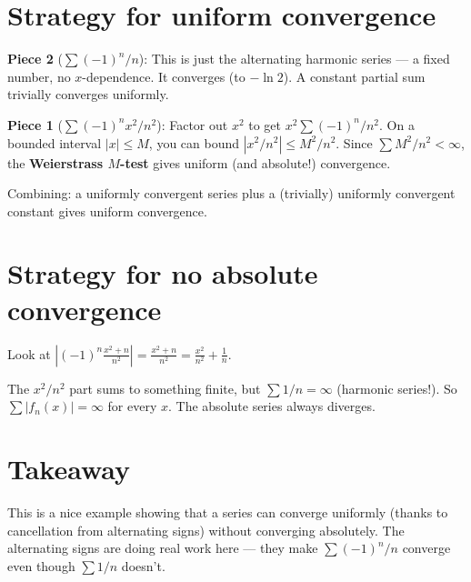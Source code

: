 \documentclass[12pt]{article}
\begin{document}
\section*{Strategy for uniform convergence}

\textbf{Piece 2} ($\sum (-1)^n / n$): This is just the alternating harmonic series --- a fixed number, no $x$-dependence. It converges (to $-\ln 2$). A constant partial sum trivially converges uniformly.

\textbf{Piece 1} ($\sum (-1)^n x^2/n^2$): Factor out $x^2$ to get $x^2 \sum (-1)^n/n^2$. On a bounded interval $|x| \leq M$, you can bound $|x^2/n^2| \leq M^2/n^2$. Since $\sum M^2/n^2 < \infty$, the \textbf{Weierstrass $M$-test} gives uniform (and absolute!) convergence.

Combining: a uniformly convergent series plus a (trivially) uniformly convergent constant gives uniform convergence.

\section*{Strategy for no absolute convergence}

Look at $\left|(-1)^n \frac{x^2+n}{n^2}\right| = \frac{x^2+n}{n^2} = \frac{x^2}{n^2} + \frac{1}{n}$.

The $x^2/n^2$ part sums to something finite, but $\sum 1/n = \infty$ (harmonic series!). So $\sum |f_n(x)| = \infty$ for every $x$. The absolute series always diverges.

\section*{Takeaway}

This is a nice example showing that a series can converge uniformly (thanks to cancellation from alternating signs) without converging absolutely. The alternating signs are doing real work here --- they make $\sum (-1)^n/n$ converge even though $\sum 1/n$ doesn't.
\end{document}

